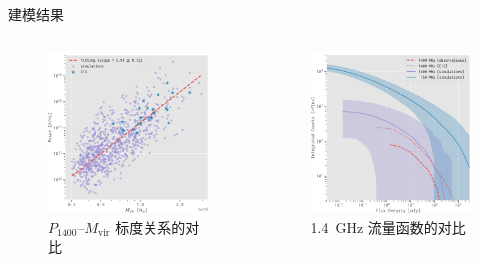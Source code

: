 \documentclass{beamer}
\newcommand{\R}[1]{\text{#1}}  %
\begin{document}
\begin{frame}{建模结果}
  \begin{columns}
    \begin{figure}
      \centering
      \includegraphics[width=\columnwidth]{halo-power-mvir}
      \caption{$P_{1400}$--$M_{\R{vir}}$ 标度关系的对比}
    \end{figure}

    \begin{figure}
      \centering
      \includegraphics[width=\columnwidth]{fluxfunc-simucomp}
      \caption{\SI{1.4}{\GHz} 流量函数的对比}
    \end{figure}
  \end{columns}
\end{frame}
\end{document}
